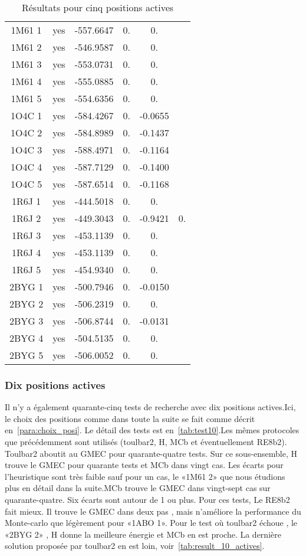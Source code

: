 \begin{table}[h]
{\begin{tabular}{cccccc}
        1M61 1 & yes &  -557.6647 & 0. & 0. &  \\
        1M61 2 & yes &  -546.9587 & 0. & 0. &  \\
        1M61 3 & yes &  -553.0731 & 0. & 0. &  \\
        1M61 4 & yes &  -555.0885 & 0. & 0. &  \\
        1M61 5 & yes &  -554.6356 & 0. & 0. &  \\
        1O4C 1 & yes &  -584.4267 & 0. & -0.0655 &  \\
        1O4C 2 & yes &  -584.8989 & 0. & -0.1437 &  \\
        1O4C 3 & yes &  -588.4971 & 0. & -0.1164 &  \\
        1O4C 4 & yes &  -587.7129 & 0. & -0.1400 &  \\
        1O4C 5 & yes &  -587.6514 & 0. & -0.1168 &  \\
        1R6J 1 & yes &  -444.5018 & 0. & 0. &  \\
        1R6J 2 & yes &  -449.3043 & 0. & -0.9421 & 0. \\
        1R6J 3 & yes &  -453.1139 & 0. & 0. &  \\
        1R6J 4 & yes &  -453.1139 & 0. & 0. &  \\
        1R6J 5 & yes &  -454.9340 & 0. & 0. &  \\
        2BYG 1 & yes &  -500.7946 & 0. & -0.0150 &  \\
        2BYG 2 & yes &  -506.2319 & 0. & 0. &  \\
        2BYG 3 & yes &  -506.8744 & 0. & -0.0131 &  \\
        2BYG 4 & yes &  -504.5135 & 0. & 0. &  \\
        2BYG 5 & yes &  -506.0052 & 0. & 0. &  \\
        \bottomrule
      \end{tabular}      
}
 \caption{Résultats pour cinq positions actives}
\label{tab:result_5_actives}
\end{table}

   \subsubsection{Dix positions actives}
Il n'y a également quarante-cinq tests de recherche avec dix positions actives.Ici, le choix des positions comme dans toute la suite se fait comme décrit en~\ref{para:choix_posi}. Le détail des tests est en~\ref{tab:test10}.Les mêmes protocoles que précédemment sont utilisés (toulbar2, H, MCb et éventuellement RE8b2). Toulbar2 aboutit au GMEC pour quarante-quatre tests. Sur ce sous-ensemble, H trouve le GMEC pour quarante tests et MCb dans vingt cas. Les écarts pour l'heuristique sont très faible sauf pour un cas, le «1M61 2» que nous étudions plus en détail dans la suite.MCb trouve le GMEC dans vingt-sept cas sur quarante-quatre. Six écarts sont autour de 1 ou plus. Pour ces tests, Le RE8b2 fait mieux. Il trouve le  GMEC dans deux pas , mais n'améliore la performance du Monte-carlo que légèrement pour «1ABO 1». Pour le test où toulbar2 échoue , le «2BYG 2» , H donne la meilleure énergie et MCb en est proche. La dernière solution proposée par toulbar2 en est loin, voir~\ref{tab:result_10_actives}.  

